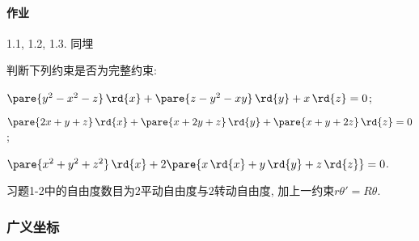 \documentclass{ctexart}
\begin{document}

\paragraph{作业} %
\label{par:作业}

1.1, 1.2, 1.3. 同埋
\begin{ex}
    判断下列约束是否为完整约束:
    \begin{cenum}
        \item $\pare{y^2-x^2-z}\,\rd{x} + \pare{z-y^2-xy}\,\rd{y} + x\,\rd{z} = 0$;
        \item $\pare{2x + y + z} \,\rd{x} + \pare{x+2y+z}\,\rd{y} + \pare{x+y+2z}\,\rd{z} = 0$;
        \item $\pare{x^2+y^2+z^2}\,\rd{x} + 2\pare{x\,\rd{x} + y\,\rd{y} + z\,\rd{z}} = 0$.
    \end{cenum}
\end{ex}
\begin{remark}
    习题1-2中的自由度数目为$2$平动自由度与$2$转动自由度, 加上一约束$r{\theta}' = R\theta$.
\end{remark}


\subsubsection{广义坐标} %
\label{ssub:广义坐标}
\end{document}
